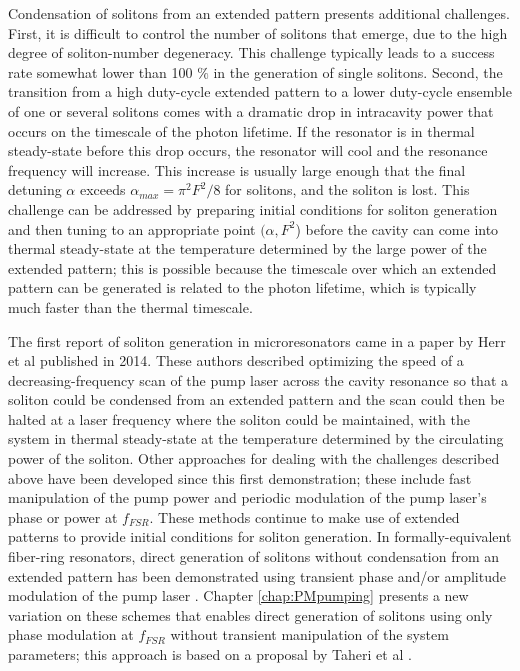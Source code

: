 {Condensation of solitons from an extended pattern presents additional challenges. First, it is difficult to control the number of solitons that emerge, due to the high degree of soliton-number degeneracy. This challenge typically leads to a success rate somewhat lower than 100 $\%$ in the generation of single solitons. Second, the transition from a high duty-cycle extended pattern to a lower duty-cycle ensemble of one or several solitons comes with a dramatic drop in intracavity power that occurs on the timescale of the photon lifetime. If the resonator is in thermal steady-state before this drop occurs, the resonator will cool and the resonance frequency will increase. This increase is usually large enough that the final detuning $\alpha$ exceeds $\alpha_{max}=\pi^2 F^2/8$ for solitons, and the soliton is lost. This challenge can be addressed by preparing initial conditions for soliton generation and then tuning to an appropriate point $(\alpha,F^2$) before the cavity can come into thermal steady-state at the temperature determined by the large power of the extended pattern; this is possible because the timescale over which an extended pattern can be generated is related to the photon lifetime, which is typically much faster than the thermal timescale.

The first report of soliton generation in microresonators came in a paper by Herr et al published in 2014\cite{Herr2014}. These authors described optimizing the speed of a decreasing-frequency scan of the pump laser across the cavity resonance so that a soliton could be condensed from an extended pattern and the scan could then be halted at a laser frequency where the soliton could be maintained, with the system in thermal steady-state at the temperature determined by the circulating power of the soliton. Other approaches for dealing with the challenges described above have been developed since this first demonstration; these include fast manipulation of the pump power \cite{Brash2015,Yi2015} and periodic modulation of the pump laser's phase or power at $f_{FSR}$\cite{Lobanov2015,Obrzud2017}. These methods continue to make use of extended patterns to provide initial conditions for soliton generation. In formally-equivalent fiber-ring resonators, direct generation of solitons without condensation from an extended pattern has been demonstrated using transient phase and/or amplitude modulation of the pump laser \cite{Jang1,Jang2,AMpaper}. Chapter \ref{chap:PMpumping} presents a new variation on these schemes that enables direct generation of solitons using only phase modulation at $f_{FSR}$ without transient manipulation of the system parameters; this approach is based on a proposal by Taheri et al \cite{Taheri2016}. 

}
